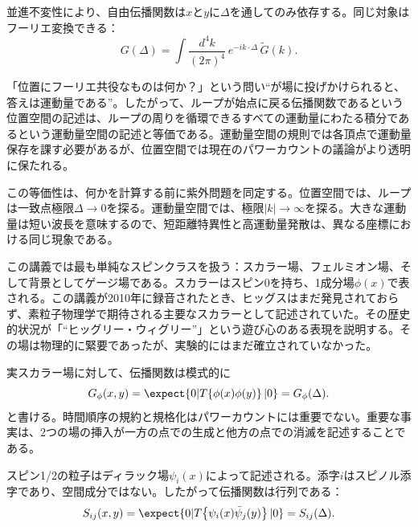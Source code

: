 並進不変性により、自由伝播関数は\(x\)と\(y\)に\(\Delta\)を通してのみ依存する。同じ対象はフーリエ変換できる：
\begin{equation}
G(\Delta)
=\int\frac{d^4k}{(2\pi)^4}\,e^{-ik\cdot\Delta}\,\widetilde G(k).
\end{equation}

「位置にフーリエ共役なものは何か？」という問い``が場に投げかけられると、答えは運動量である''。したがって、ループが始点に戻る伝播関数であるという位置空間の記述は、ループの周りを循環できるすべての運動量にわたる積分であるという運動量空間の記述と等価である。運動量空間の規則では各頂点で運動量保存を課す必要があるが、位置空間では現在のパワーカウントの議論がより透明に保たれる。

この等価性は、何かを計算する前に紫外問題を同定する。位置空間では、ループは一致点極限\(\Delta\to0\)を探る。運動量空間では、極限\(|k|\to\infty\)を探る。大きな運動量は短い波長を意味するので、短距離特異性と高運動量発散は、異なる座標における同じ現象である。

この講義では最も単純なスピンクラスを扱う：スカラー場、フェルミオン場、そして背景としてゲージ場である。スカラーはスピン0を持ち、1成分場\(\phi(x)\)で表される。この講義が2010年に録音されたとき、ヒッグスはまだ発見されておらず、素粒子物理学で期待される主要なスカラーとして記述されていた。その歴史的状況が「``ヒッグリー・ウィグリー''」という遊び心のある表現を説明する。その場は物理的に緊要であったが、実験的にはまだ確立されていなかった。

実スカラー場に対して、伝播関数は模式的に
\begin{equation}
G_\phi(x,y)=\expect{0|T\!\left\{\phi(x)\phi(y)\right\}|0}
=G_\phi(\Delta).
\end{equation}
と書ける。時間順序の規約と規格化はパワーカウントには重要でない。重要な事実は、2つの場の挿入が一方の点での生成と他方の点での消滅を記述することである。

\begin{classroomqa}
\end{classroomqa}

スピン1/2の粒子はディラック場\(\psi_i(x)\)によって記述される。添字\(i\)はスピノル添字であり、空間成分ではない。したがって伝播関数は行列である：
\begin{equation}
S_{ij}(x,y)=\expect{0|T\!\left\{\psi_i(x)\bar\psi_j(y)\right\}|0}
=S_{ij}(\Delta).
\end{equation}

